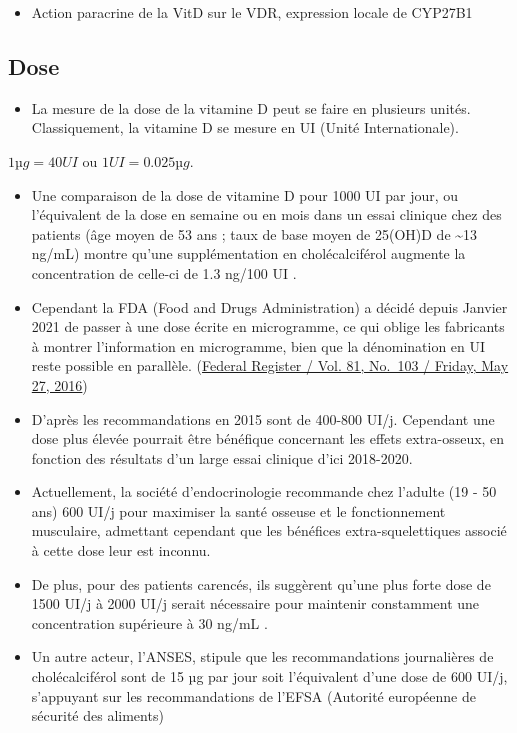 \documentclass[
  letterpaper,
  DIV=11,
  numbers=noendperiod]{scrartcl}
\providecommand{\tightlist}{%
  \setlength{\itemsep}{0pt}\setlength{\parskip}{0pt}}\usepackage{longtable,booktabs,array}
\begin{document}
\begin{itemize}
\tightlist
\item
  Action paracrine de la VitD sur le VDR, expression locale de CYP27B1
  \autocite{Carmeliet.2015}
\end{itemize}

\hypertarget{dose}{%
\subsection{Dose}\label{dose}}

\begin{itemize}
\tightlist
\item
  La mesure de la dose de la vitamine D peut se faire en plusieurs
  unités. Classiquement, la vitamine D se mesure en UI (Unité
  Internationale).
\end{itemize}

\(1 µg = 40 UI\) ou \(1 UI = 0.025 µg\).

\begin{itemize}
\item
  Une comparaison de la dose de vitamine D pour 1000 UI par jour, ou
  l'équivalent de la dose en semaine ou en mois dans un essai clinique
  chez des patients (âge moyen de 53 ans ; taux de base moyen de 25(OH)D
  de \textasciitilde13 ng/mL) montre qu'une supplémentation en
  cholécalciférol augmente la concentration de celle-ci de 1.3 ng/100 UI
  \autocite{Bouillon.2017}.
\item
  Cependant la FDA (Food and Drugs Administration) a décidé depuis
  Janvier 2021 de passer à une dose écrite en microgramme, ce qui oblige
  les fabricants à montrer l'information en microgramme, bien que la
  dénomination en UI reste possible en parallèle.
  (\href{https://www.govinfo.gov/content/pkg/FR-2016-05-27/pdf/2016-11867.pdf}{Federal
  Register / Vol. 81, No.~103 / Friday, May 27, 2016})
\item
  D'après \textcite{Carmeliet.2015} les recommandations en 2015 sont de
  400-800 UI/j. Cependant une dose plus élevée pourrait être bénéfique
  concernant les effets extra-osseux, en fonction des résultats d'un
  large essai clinique d'ici 2018-2020.
\item
  Actuellement, la société d'endocrinologie recommande chez l'adulte (19
  - 50 ans) 600 UI/j pour maximiser la santé osseuse et le
  fonctionnement musculaire, admettant cependant que les bénéfices
  extra-squelettiques associé à cette dose leur est inconnu.
\item
  De plus, pour des patients carencés, ils suggèrent qu'une plus forte
  dose de 1500 UI/j à 2000 UI/j serait nécessaire pour maintenir
  constamment une concentration supérieure à 30 ng/mL
  \autocite{Holick.2011}.
\item
  Un autre acteur, l'ANSES, stipule que les recommandations journalières
  de cholécalciférol sont de 15 µg par jour soit l'équivalent d'une dose
  de 600 UI/j, s'appuyant sur les recommandations de l'EFSA (Autorité
  européenne de sécurité des aliments) \autocite{travail.2022}
\end{itemize}
\end{document}
